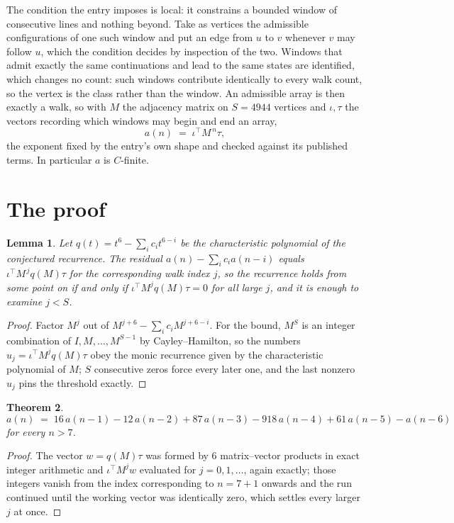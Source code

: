 \documentclass[11pt,a4paper]{article}
\theoremstyle{plain}
\newtheorem{theorem}{Theorem}
\newtheorem{lemma}[theorem]{Lemma}
\theoremstyle{definition}
\begin{document}
The condition the entry imposes is local: it constrains a bounded window of consecutive lines and nothing beyond. Take as
vertices the admissible configurations of one such window and put an edge from $u$ to $v$
whenever $v$ may follow $u$, which the condition decides by inspection of the two. Windows that admit exactly the same continuations and lead to the same states are identified, which changes no count: such windows contribute identically to every walk count, so the vertex is the class rather than the window. An
admissible array is then exactly a walk, so with $M$ the adjacency matrix on $S=4944$ vertices
and $\iota,\tau$ the vectors recording which windows may begin and end an array,
\[
a(n)\;=\;\iota^{\!\top}M^{\,n}\tau ,
\]
the exponent fixed by the entry's own shape and checked against its published terms. In
particular $a$ is $C$-finite.

\section{The proof}

\begin{lemma}\label{lem:crit}
Let $q(t)=t^{6}-\sum_i c_it^{6-i}$ be the characteristic polynomial of the
conjectured recurrence. The residual $a(n)-\sum_ic_ia(n-i)$ equals
$\iota^{\!\top}M^{\,j}q(M)\tau$ for the corresponding walk index $j$, so the recurrence
holds from some point on if and only if $\iota^{\!\top}M^{j}q(M)\tau=0$ for all large $j$,
and it is enough to examine $j<S$.
\end{lemma}

\begin{proof}
Factor $M^{j}$ out of $M^{j+6}-\sum_ic_iM^{j+6-i}$. For the bound, $M^{S}$
is an integer combination of $I,M,\dots,M^{S-1}$ by Cayley--Hamilton, so the numbers
$u_j=\iota^{\!\top}M^{j}q(M)\tau$ obey the monic recurrence given by the characteristic
polynomial of $M$; $S$ consecutive zeros force every later one, and the last nonzero $u_j$
pins the threshold exactly.
\end{proof}

\begin{theorem}
\[
a(n)\;=\;16\,a(n-1) - 12\,a(n-2) + 87\,a(n-3) - 918\,a(n-4) + 61\,a(n-5) - a(n-6)
\]
for every $n>7$.
\end{theorem}

\begin{proof}
The vector $w=q(M)\tau$ was formed by $6$ matrix--vector products in exact integer
arithmetic and $\iota^{\!\top}M^{j}w$ evaluated for $j=0,1,\dots$, again exactly; those
integers vanish from the index corresponding to $n=7+1$ onwards and the run continued
until the working vector was identically zero, which settles every larger $j$ at once.
\end{proof}
\end{document}
